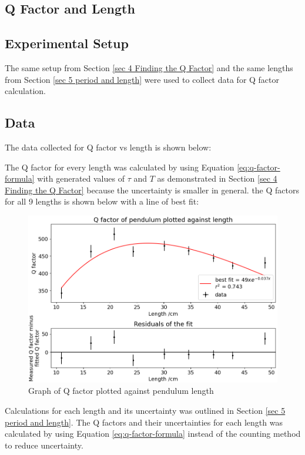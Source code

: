 \documentclass[11pt]{article}
\begin{document}
\begin{multicols}{2}
\section{Q Factor and Length}

\subsection{Experimental Setup}
The same setup from Section \ref{sec 4 Finding the Q Factor} and the same lengths from Section \ref{sec 5 period and length} were used to collect data for Q factor calculation.


\subsection{Data}
The data collected for Q factor vs length is shown below:

The Q factor for every length was calculated by using Equation \ref{eq:q-factor-formula} with generated values of $\tau$ and $T$ as demonstrated in Section \ref{sec 4 Finding the Q Factor} because the uncertainty is smaller in general. the Q factors for all 9 lengths is shown below with a line of best fit:

\begin{figure}[H]
    \centering
    \includegraphics[width=\linewidth]{../figures/qfactor_vs_length.png}
    \caption{\centering Graph of Q factor plotted against pendulum length}
    \label{fig:figure 8}
\end{figure}

Calculations for each length and its uncertainty was outlined in Section \ref{sec 5 period and length}. The Q factors and their uncertainties for each length was calculated by using Equation \ref{eq:q-factor-formula} instead of the counting method to reduce uncertainty.


\end{multicols}
\end{document}
